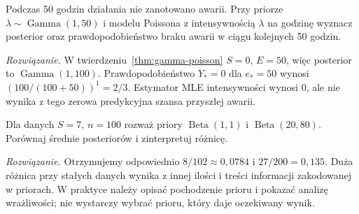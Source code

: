 \begin{zadanie}
Podczas 50 godzin działania nie zanotowano awarii. Przy priorze
$\lambda\sim\operatorname{Gamma}(1,50)$ i modelu Poissona
z intensywnością $\lambda$ na godzinę wyznacz posterior oraz
prawdopodobieństwo braku awarii w ciągu kolejnych 50 godzin.
\par\emph{Rozwiązanie.} W twierdzeniu~\ref{thm:gamma-poisson}
$S=0$, $E=50$, więc posterior to $\operatorname{Gamma}(1,100)$.
Prawdopodobieństwo $Y_*=0$ dla $e_*=50$ wynosi
$(100/(100+50))^1=2/3$.
Estymator MLE intensywności wynosi $0$, ale nie wynika z tego
zerowa predykcyjna szansa przyszłej awarii.
\end{zadanie}

\begin{zadanie}
Dla danych $S=7$, $n=100$ rozważ priory
$\operatorname{Beta}(1,1)$ i $\operatorname{Beta}(20,80)$.
Porównaj średnie posteriorów i zinterpretuj różnicę.
\par\emph{Rozwiązanie.} Otrzymujemy odpowiednio
$8/102\approx0{,}0784$ i $27/200=0{,}135$.
Duża różnica przy stałych danych wynika z innej ilości i treści
informacji zakodowanej w priorach. W praktyce należy opisać
pochodzenie prioru i pokazać analizę wrażliwości; nie wystarczy
wybrać prioru, który daje oczekiwany wynik.
\end{zadanie}


